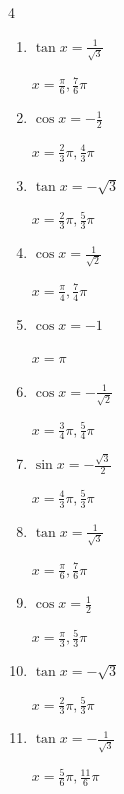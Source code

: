 \begin{multicols}{4}
\begin{enumerate}
        $\displaystyle x = \frac{\pi}{4} , \frac{3}{4}\pi$

  \item $\displaystyle \tan{x}  = \frac{1}{\sqrt{3}}$

        $\displaystyle x = \frac{\pi}{6} , \frac{7}{6}\pi$

  \item $\displaystyle \cos{x}  = -\frac{1}{2}$

        $\displaystyle x = \frac{2}{3}\pi , \frac{4}{3}\pi$

  \item $\displaystyle \tan{x}  = -\sqrt{3}$

        $\displaystyle x = \frac{2}{3}\pi , \frac{5}{3}\pi$

  \item $\displaystyle \cos{x}  = \frac{1}{\sqrt{2}}$

        $\displaystyle x = \frac{\pi}{4} , \frac{7}{4}\pi$

  \item $\displaystyle \cos{x}  = -1$

        $\displaystyle x = \pi$

  \item $\displaystyle \cos{x}  = -\frac{1}{\sqrt{2}}$

        $\displaystyle x = \frac{3}{4}\pi , \frac{5}{4}\pi$

  \item $\displaystyle \sin{x}  = -\frac{\sqrt{3}}{2}$

        $\displaystyle x = \frac{4}{3}\pi , \frac{5}{3}\pi$

  \item $\displaystyle \tan{x}  = \frac{1}{\sqrt{3}}$

        $\displaystyle x = \frac{\pi}{6} , \frac{7}{6}\pi$

  \item $\displaystyle \cos{x}  = \frac{1}{2}$

        $\displaystyle x = \frac{\pi}{3} , \frac{5}{3}\pi$

  \item $\displaystyle \tan{x}  = -\sqrt{3}$

        $\displaystyle x = \frac{2}{3}\pi , \frac{5}{3}\pi$

\columnbreak %

  \item $\displaystyle \tan{x}  = -\frac{1}{\sqrt{3}}$

        $\displaystyle x = \frac{5}{6}\pi , \frac{11}{6}\pi$


\end{enumerate}
\end{multicols}
